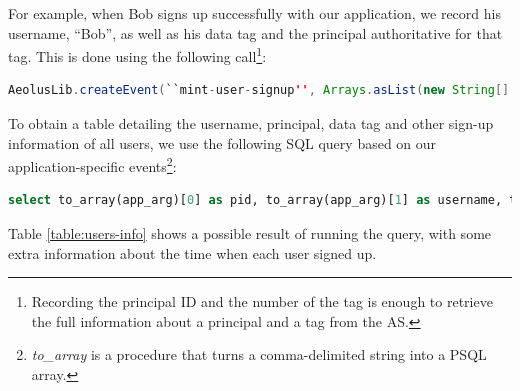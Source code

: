For example, when Bob signs up successfully with our application, we record his username, ``Bob'', as well as his data tag and the principal authoritative for that tag. This is done using the following call\footnote{Recording the principal ID and the number of the tag is enough to retrieve the full information about a principal and a tag from the AS.}:

\begin{lstlisting}[language=Java, label=code:create-event]
  AeolusLib.createEvent(``mint-user-signup'', Arrays.asList(new String[] {``Bob'', ``5'', ``10''}));
\end{lstlisting}

To obtain a table detailing the username, principal, data tag and other sign-up information of all users, we use the following SQL query based on our application-specific events\footnote{\emph{to\_array} is a procedure that turns a comma-delimited string into a PSQL array.}:

\begin{lstlisting}[language=SQL, deletendkeywords={TIMESTAMP}, label=code:mint-signup]
select to_array(app_arg)[0] as pid, to_array(app_arg)[1] as username, to_array(app_arg)[2] as tag, timestamp as signed_up, event_counter from events where op_name='mint-user-signup'
\end{lstlisting}

\noindent
Table \ref{table:users-info} shows a possible result of running the query, with some extra information about the time when each user signed up.

